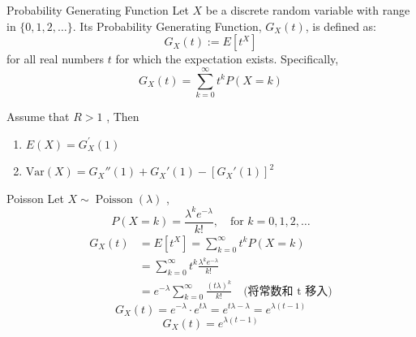 \documentclass[../main.tex]{subfiles}
\begin{document}
\begin{definition}{Probability Generating Function}{}
    Let $X$ be a discrete random variable with range in $\{0, 1, 2, \dots\}$. Its Probability Generating Function, $G_X(t)$, is defined as:
$$G_X(t) := E[t^X]$$
for all real numbers $t$ for which the expectation exists. Specifically, 
$$G_X(t) = \sum_{k=0}^{\infty} t^k P(X=k)$$
\end{definition}

\begin{proposition}{}{}
    Assume that \(  R> 1  \) , Then \begin{enumerate}
        \item \(  E\left( X \right)= G_{X}^{\prime} \left( 1 \right)    \)
        \item  $\text{Var}(X) = G_X''(1) + G_X'(1) - [G_X'(1)]^2$
    \end{enumerate}
     
\end{proposition}

\begin{example}{Poisson}{}
    Let  \(  X\sim \operatorname{Poisson}\left(  \lambda  \right)   \) , $$P(X=k) = \frac{\lambda^k e^{-\lambda}}{k!}, \quad \text{for } k = 0, 1, 2, \dots$$
    \[
\begin{aligned} G_X(t) &= E[t^X] = \sum_{k=0}^{\infty} t^k P(X=k) \\ &= \sum_{k=0}^{\infty} t^k \frac{\lambda^k e^{-\lambda}}{k!} \\ &= e^{-\lambda} \sum_{k=0}^{\infty} \frac{(t\lambda)^k}{k!} \quad \text{(将常数和 t 移入)} \end{aligned}
\] \[
G_X(t) = e^{-\lambda} \cdot e^{t\lambda} = e^{t\lambda - \lambda} = e^{\lambda(t-1)}
\] \[
G_X(t) = e^{\lambda(t-1)}
\]
\end{example}
\end{document}
